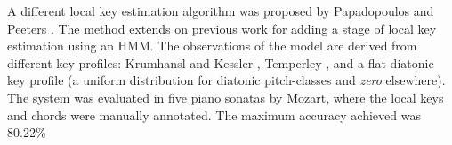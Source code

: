 




A different local key estimation algorithm was proposed by Papadopoulos and Peeters \cite{papadopoulos2009local}. The method extends on previous work \cite{papadopoulos2008simultaneous} for adding a stage of local key estimation using an HMM. The observations of the model are derived from different key profiles: Krumhansl and Kessler \cite{krumhansl1982tracing}, Temperley \cite{temperley1999whats}, and a flat diatonic key profile (a uniform distribution for diatonic pitch-classes and \emph{zero} elsewhere). The system was evaluated in five piano sonatas by Mozart, where the local keys and chords were manually annotated. The maximum accuracy achieved was 80.22\%

